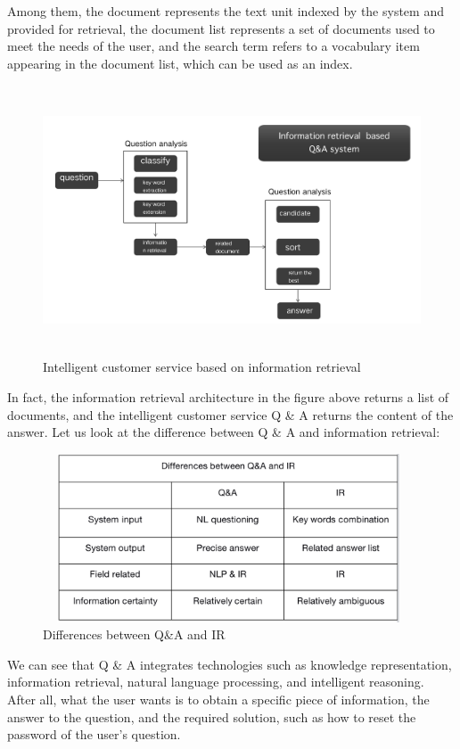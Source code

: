 \documentclass[11pt,en,number]{elegantpaper}
\begin{document}
	Among them, the document represents the text unit indexed by the system and provided for retrieval, the document list represents a set of documents used to meet the needs of the user, and the search term refers to a vocabulary item appearing in the document list, which can be used as an index.
	\begin{figure}[H]
		\centering
		\includegraphics[width=13cm, height=8cm]{IR}
		\caption{Intelligent customer service based on information retrieval}
	\end{figure}
	In fact, the information retrieval architecture in the figure above returns a list of documents, and the intelligent customer service Q \& A returns the content of the answer. Let us look at the difference between Q \& A and information retrieval:
	\begin{figure}[H]
		\centering
		\includegraphics[width=11cm, height=5cm]{Differences}
		\caption{Differences between Q\&A and IR}
	\end{figure}
	We can see that Q \& A integrates technologies such as knowledge representation, information retrieval, natural language processing, and intelligent reasoning. After all, what the user wants is to obtain a specific piece of information, the answer to the question, and the required solution, such as how to reset the password of the user's question.
	
\end{document}
